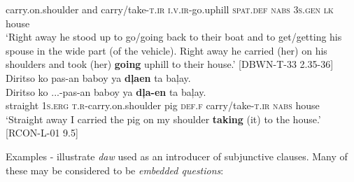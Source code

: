carry.on.shoulder  and  carry/take-\textsc{t.ir}  \textsc{i.v.ir}-go.uphill  \textsc{spat.def}  \textsc{nabs}
3\textsc{s.gen}  \textsc{lk}  house \\
\glt `Right away he stood up to go/going back to their boat and to get/getting his spouse in the wide part (of the vehicle). Right away he carried (her) on his shoulders and took (her) \textbf{going} uphill to their house.’ [DBWN-T-33 2.35-36]
\z
\ea
\label{bkm:Ref474488975}
Diritso  ko  pas-an  baboy  ya  \textbf{dļaen}   ta  baļay. \smallskip\\
\gll Diritso  ko  ...-pas-an  baboy  ya  \textbf{dļa-en}   ta  baļay. \\
straight  1\textsc{s.erg}  \textsc{t.r}-carry.on.shoulder  pig  \textsc{def.f}  carry/take-\textsc{t.ir}  \textsc{nabs}  house \\
‘Straight away I carried the pig on my shoulder \textbf{taking} (it) to the house.’ [RCON-L-01 9.5]
\z


Examples - illustrate \textit{daw} used as an introducer of subjunctive clauses. Many of these may be considered to be \textit{embedded questions}:

